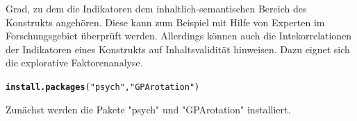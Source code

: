 \documentclass{article}\usepackage[]{graphicx}\usepackage[]{color}
\makeatletter
\newcommand{\hlstr}[1]{\textcolor[rgb]{0.192,0.494,0.8}{#1}}%
\newcommand{\hlstd}[1]{\textcolor[rgb]{0.345,0.345,0.345}{#1}}%
\newcommand{\hlkwd}[1]{\textcolor[rgb]{0.737,0.353,0.396}{\textbf{#1}}}%
\newenvironment{kframe}{%
 \def\at@end@of@kframe{}%
 \ifinner\ifhmode%
  \def\at@end@of@kframe{\end{minipage}}%
  \begin{minipage}{\columnwidth}%
 \fi\fi%
 \def\FrameCommand##1{\hskip\@totalleftmargin \hskip-\fboxsep
 \colorbox{shadecolor}{##1}\hskip-\fboxsep
     \hskip-\linewidth \hskip-\@totalleftmargin \hskip\columnwidth}%
 \MakeFramed {\advance\hsize-\width
   \@totalleftmargin\z@ \linewidth\hsize
   \@setminipage}}%
 {\par\unskip\endMakeFramed%
 \at@end@of@kframe}
\newenvironment{knitrout}{}{} %
\makeatother
\begin{document}
Grad, zu dem die Indikatoren dem inhaltlich-semantischen Bereich des Konstrukts angehören. Diese kann zum Beispiel mit Hilfe von Experten im Forschungsgebiet überprüft werden. Allerdings können auch die Intekorrelationen der Indikatoren eines Konstrukts auf Inhaltsvalidität hinweisen.\cite{hildebrandt1984kausalanalytische} Dazu eignet sich die explorative Faktorenanalyse.\cite{vinzi2003pls}\\
\begin{knitrout}
\color{fgcolor}\begin{kframe}
\begin{alltt}
\hlkwd{install.packages}\hlstd{(}\hlstr{"psych"}\hlstd{,}\hlstr{"GPArotation"}\hlstd{)}
\end{alltt}
\end{kframe}
\end{knitrout}
Zunächst werden die Pakete "psych" und "GPArotation" installiert.
\end{document}
